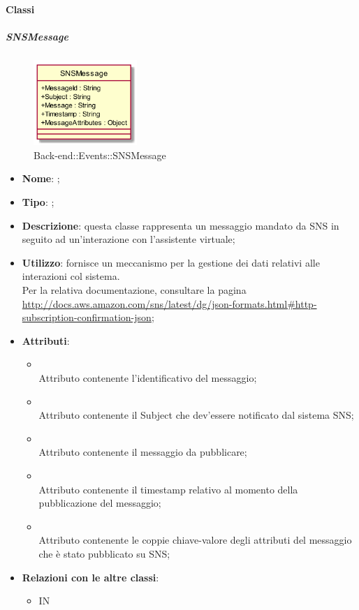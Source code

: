 \paragraph{Classi}
\hypertarget{SNSMessage_label}{\subparagraph{SNSMessage}}
\begin{figure}[h]
	\centering
	\includegraphics[width=0.35\textwidth,height=\textheight,keepaspectratio]{images/ClassSNSMessage.png}
	\caption{Back-end::Events::SNSMessage}
\end{figure}
\begin{itemize}
	\item \textbf{Nome}: ;
	\item \textbf{Tipo}: ;
	\item \textbf{Descrizione}: questa classe rappresenta un messaggio mandato da SNS in seguito ad un'interazione con l'assistente virtuale;
	\item \textbf{Utilizzo}: fornisce un meccanismo  per la gestione dei dati relativi alle interazioni col sistema.\\
	Per la relativa documentazione, consultare la pagina \url{http://docs.aws.amazon.com/sns/latest/dg/json-formats.html#http-subscription-confirmation-json};
	\item \textbf{Attributi}:
	\begin{itemize}
		\item[]  \\
		Attributo contenente l'identificativo del messaggio;
		\item[]  \\
		Attributo contenente il Subject che dev'essere notificato dal sistema SNS;
		\item[]  \\
		Attributo contenente il messaggio da pubblicare;
		\item[]  \\
		Attributo contenente il timestamp relativo al momento della pubblicazione del messaggio;
		\item[]  \\
		Attributo contenente le coppie chiave-valore degli attributi del messaggio che è stato pubblicato su SNS;
	\end{itemize}
	\item \textbf{Relazioni con le altre classi}:
	\begin{itemize}
		\item IN \hyperlink{SNSRecord_label}{}
	\end{itemize}
\end{itemize}
\FloatBarrier

